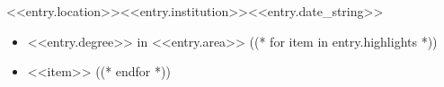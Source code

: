 \begin{cvsubsection}{<<entry.location>>}{<<entry.institution>>}{<<entry.date_string>>}
    \begin{itemize}
        \item <<entry.degree>> in <<entry.area>>
((* for item in entry.highlights *))
        \item <<item>>
((* endfor *))
    \end{itemize}
\end{cvsubsection}
